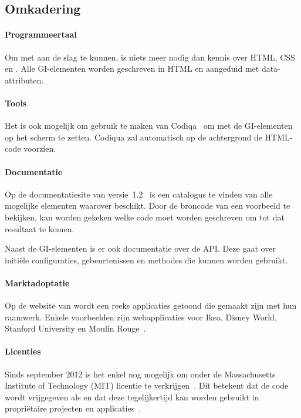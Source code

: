 \subsection{Omkadering}
\paragraph{Programmeertaal}
Om met \jqm{} aan de slag te kunnen, is niets meer nodig dan kennis over HTML, CSS en \js{}. 
Alle GI-elementen worden geschreven in HTML en aangeduid met data-attributen.

\paragraph{Tools}
Het is ook mogelijk om gebruik te maken van Codiqa~\cite{Sperry2012} om met  de GI-elementen op het scherm te zetten. 
Codiqua zal automatisch op de achtergrond de HTML-code voorzien.

\paragraph{Documentatie}
Op de documentatiesite van versie~1.2~\cite{JQuery2012b} is een catalogus te vinden van alle mogelijke elementen waarover \jqm{} beschikt. 
Door de broncode van een voorbeeld te bekijken, kan worden gekeken welke code moet worden geschreven om tot dat resultaat te komen.

Naast de GI-elementen is er ook documentatie over de API. 
Deze gaat over initiële configuraties, gebeurtenissen en methodes die kunnen worden gebruikt.

\paragraph{Marktadoptatie}
Op de website van \jqm{} wordt een reeks applicaties getoond die gemaakt zijn met hun raamwerk. 
Enkele voorbeelden zijn webapplicaties voor Ikea, Disney World, Stanford University en Moulin Rouge~\cite{JQuery2012a}. 

\paragraph{Licenties}
Sinds september 2012 is het enkel nog mogelijk om \jqm{} onder de Massachusetts Institute of Technology (MIT) licentie te verkrijgen~\cite{Dmethvin2012}. 
Dit betekent dat de code wordt vrijgegeven als  en dat deze tegelijkertijd kan worden gebruikt in propriëtaire projecten en applicaties~\cite{PhilDutson2012}.

